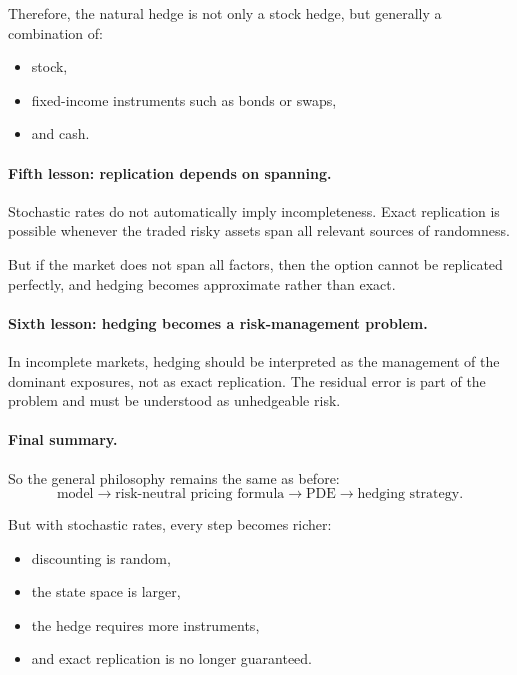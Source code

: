 \documentclass[11pt]{article}
\theoremstyle{plain}
\theoremstyle{definition}
\theoremstyle{remark}
\begin{document}
Therefore, the natural hedge is not only a stock hedge, but generally a
combination of:
\begin{itemize}[leftmargin=1.4em]
    \item stock,
    \item fixed-income instruments such as bonds or swaps,
    \item and cash.
\end{itemize}

\paragraph{Fifth lesson: replication depends on spanning.}
Stochastic rates do not automatically imply incompleteness.
Exact replication is possible whenever the traded risky assets span all
relevant sources of randomness.

But if the market does not span all factors, then the option cannot be
replicated perfectly, and hedging becomes approximate rather than exact.

\paragraph{Sixth lesson: hedging becomes a risk-management problem.}
In incomplete markets, hedging should be interpreted as the management
of the dominant exposures, not as exact replication.
The residual error is part of the problem and must be understood as
unhedgeable risk.

\paragraph{Final summary.}
So the general philosophy remains the same as before:
\[
\text{model}
\longrightarrow
\text{risk-neutral pricing formula}
\longrightarrow
\text{PDE}
\longrightarrow
\text{hedging strategy}.
\]

But with stochastic rates, every step becomes richer:
\begin{itemize}[leftmargin=1.4em]
    \item discounting is random,
    \item the state space is larger,
    \item the hedge requires more instruments,
    \item and exact replication is no longer guaranteed.
\end{itemize}
\end{document}
